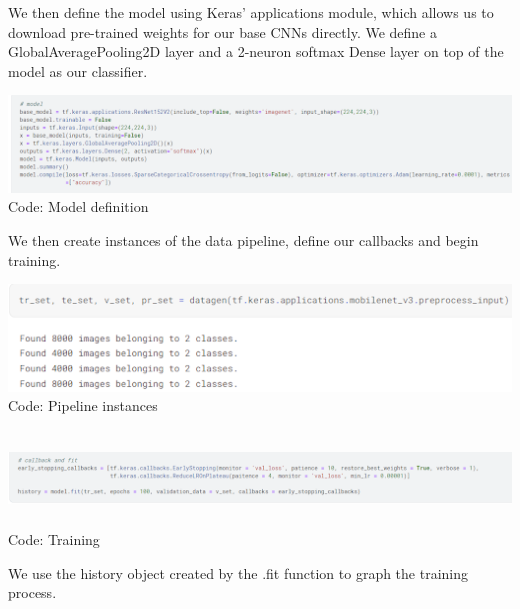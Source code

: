   
We then define the model using Keras’ applications module, which allows us to download pre-trained weights for our base CNNs directly. We define a GlobalAveragePooling2D layer and a 2-neuron softmax Dense layer on top of the model as our classifier.

\begin{center}
   \includegraphics[width=6.5in]{images/c2.png} 
   \\\fontsize{11pt}{24pt} Code: Model definition
\end{center}
  
		
  
We then create instances of the data pipeline, define our callbacks and begin training. 

\begin{center}
   \includegraphics[width=6in]{images/c3.png} 
   \\\fontsize{11pt}{24pt} Code: Pipeline instances
\end{center}

		
\begin{center}
   \includegraphics[width=6in,height=1in]{images/c4.png} 
   \\\fontsize{11pt}{24pt} Code: Training
\end{center}
		 

We use the history object created by the .fit function to graph the training process.

